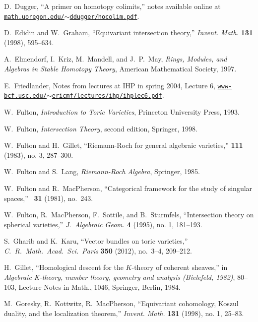 \documentclass[11pt]{amsart}
\theoremstyle{definition}
\begin{document}
\begin{thebibliography}{CHWW}
 D.~Dugger, ``A primer on homotopy colimits,'' notes available online at \texttt{\href{http://math.uoregon.edu/~ddugger/hocolim.pdf}{math.uoregon.edu/$\sim$ddugger/hocolim.pdf}}.

 D.~Edidin and W.~Graham, ``Equivariant intersection theory,'' {\em Invent. Math.} {\bf 131} (1998), 595--634.

 A.~Elmendorf, I.~Kriz, M.~Mandell, and J.~P.~May, {\em Rings, Modules, and Algebras in Stable Homotopy Theory}, American Mathematical Society, 1997.

 E.~Friedlander, Notes from lectures at IHP in spring 2004, Lecture 6, \texttt{\href{http://www-bcf.usc.edu/~ericmf/lectures/ihp/ihplec6.pdf}{www-bcf.usc.edu/$\sim$ericmf/lectures/ihp/ihplec6.pdf}}.

 W.~Fulton, \emph{Introduction to Toric Varieties}, Princeton University Press, 1993.

 W.~Fulton, \emph{Intersection Theory}, second edition, Springer, 1998.

 W.~Fulton and H.~Gillet, ``Riemann-Roch for general algebraic varieties,''  {\bf 111} (1983), no. 3, 287--300.

 W.~Fulton and S.~Lang, \emph{Riemann-Roch Algebra}, Springer, 1985.

 W.~Fulton and R.~MacPherson, ``Categorical framework for the study of singular spaces,'' ~{\bf 31} (1981), no.~243. 

 W.~Fulton, R.~MacPherson, F.~Sottile, and B.~Sturmfels, ``Intersection theory on spherical varieties,'' {\em J.~Algebraic Geom.} {\bf 4} (1995), no. 1, 181--193.

 S.~Gharib and K.~Karu, ``Vector bundles on toric varieties,'' {\em C.~R.~Math.~Acad.~Sci.~Paris} {\bf 350} (2012), no.~3--4, 209--212.

 H.~Gillet, ``Homological descent for the $K$-theory of coherent sheaves,'' in {\em Algebraic K-theory, number theory, geometry and analysis (Bielefeld, 1982)}, 80--103, Lecture Notes in Math., 1046, Springer, Berlin, 1984.

 M.~Goresky, R.~Kottwitz, R.~MacPherson, ``Equivariant cohomology, {K}oszul duality, and the localization theorem,'' {\em Invent. Math.} {\bf 131} (1998), no. 1, 25--83. 


\end{thebibliography}
\end{document}
